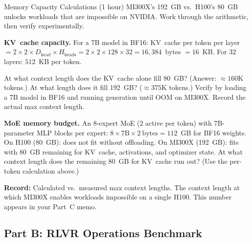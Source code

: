 \begin{exercise}{Memory Capacity Calculations (1 hour)}
MI300X's 192~GB vs.\ H100's 80~GB unlocks workloads that are impossible on NVIDIA. Work through the arithmetic, then verify experimentally.

\textbf{KV~cache capacity.}
For a 7B model in BF16: KV~cache per token per layer $= 2 \times 2 \times D_{\text{head}} \times H_{\text{heads}} = 2 \times 2 \times 128 \times 32 = 16{,}384$~bytes $= 16$~KB. For 32 layers: $512$~KB per token.

At what context length does the KV~cache alone fill 80~GB? (Answer: $\approx 160$K tokens.) At what length does it fill 192~GB? ($\approx 375$K tokens.) Verify by loading a 7B model in BF16 and running generation until OOM on MI300X. Record the actual max context length.

\textbf{MoE memory budget.}
An 8-expert MoE (2 active per token) with 7B-parameter MLP blocks per expert: $8 \times 7\text{B} \times 2~\text{bytes} = 112$~GB for BF16 weights. On H100 (80~GB): does not fit without offloading. On MI300X (192~GB): fits with 80~GB remaining for KV~cache, activations, and optimizer state. At what context length does the remaining 80~GB for KV~cache run out? (Use the per-token calculation above.)

\textbf{Record:} Calculated vs.\ measured max context lengths. The context length at which MI300X enables workloads impossible on a single H100. This number appears in your Part~C memo.
\end{exercise}

\subsection{Part B: RLVR Operations Benchmark}

